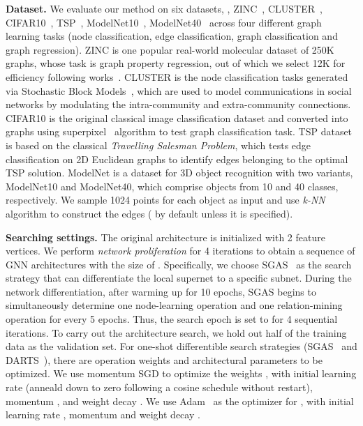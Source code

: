 \noindent
\textbf{Dataset. }
We evaluate our method on six datasets, \ie, ZINC~\cite{ZINC}, CLUSTER~\cite{bench}, CIFAR10~\cite{CIFAR10}, TSP~\cite{bench}, ModelNet10~\cite{ModelNet}, ModelNet40~\cite{ModelNet} across four different graph learning tasks (node classification, edge classification, graph classification and graph regression). 
ZINC is one popular real-world molecular dataset of 250K graphs, whose task is graph property regression, out of which we select 12K for efficiency following works~\cite{Cai2021RethinkingGN, PNA, bench}. 
CLUSTER is the node classification tasks generated via Stochastic Block Models~\cite{SBM}, which are used to model communications in social networks by modulating the intra-community and extra-community connections. 
CIFAR10 is the original classical image classification dataset and converted into graphs using superpixel~\cite{SLIC} algorithm to test graph classification task. 
TSP dataset is based on the classical \emph{Travelling Salesman Problem}, which tests edge classification on 2D Euclidean graphs to identify edges belonging to the optimal TSP solution. 
ModelNet is a dataset for 3D object recognition with two variants, ModelNet10 and ModelNet40, which comprise objects from 10 and 40 classes, respectively. 
We sample 1024 points for each object as input and use \emph{k-NN} algorithm to construct the edges ( by default unless it is specified). 



\noindent
\textbf{Searching settings. }
The original architecture is initialized with 2 feature vertices. 
We perform \emph{network proliferation} for 4 iterations to obtain a sequence of GNN architectures with the size of . 
Specifically, we choose SGAS~\cite{SGAS} as the search strategy that can differentiate the local supernet to a specific subnet. 
During the network differentiation, after warming up for 10 epochs, SGAS begins to simultaneously determine one node-learning operation and one relation-mining operation for every 5 epochs. 
Thus, the search epoch is set to  for 4 sequential iterations. 
To carry out the architecture search, we hold out half of the training data as the validation set. 
For one-shot differentible search strategies (SGAS~\cite{SGAS} and DARTS~\cite{DARTS}), there are operation weights  and architectural parameters  to be optimized. 
We use momentum SGD to optimize the weights , with initial learning rate  (anneald down to zero following a cosine schedule without restart), momentum , and weight decay . 
We use Adam~\cite{ADAM} as the optimizer for , with initial learning rate , momentum  and weight decay . 



